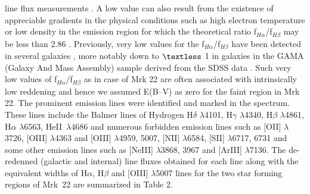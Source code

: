 \documentclass[useAMS,usenatbib]{mn2e}
\begin{document}
line flux measurements \citep{2006MNRAS.372..961K}. A low value can also result from the existence of appreciable gradients in the physical conditions such as high electron temperature or low density
in the emission region for which the theoretical ratio f$_{H\alpha}$/f$_{H\beta}$ may be less than 2.86 \citep{1980IzKry..62...54G,2009A&A...508..615L}. Previously, very low values for the f$_{H\alpha}$/f$_{H\beta}$ have been detected in several galaxies \citep{2009A&A...508..615L,2009MNRAS.396...97R}, more notably down to $\textless$ 1 in galaxies in the GAMA (Galaxy And Mass Assembly) sample derived from the SDSS data \citep{2013MNRAS.433.2764G}. Such very low values of f$_{H\alpha}$/f$_{H\beta}$ as in case of Mrk 22 are often associated with intrinsically low reddening and hence we assumed E(B--V) as zero for the faint region in Mrk 22. The prominent emission lines were identified and marked in the spectrum. These lines include the Balmer lines of Hydrogen H${\delta}$ $\lambda$4101, H${\gamma}$ $\lambda$4340, H${\beta}$ $\lambda$4861, H${\alpha}$ $\lambda$6563, He{\small{II}}~$\lambda$4686 and numerous forbidden emission lines such as [O{\small{II}}] $\lambda$3726, [O{\small{III}}] $\lambda$4363 and [O{\small{III}}] $\lambda$4959, 5007, [N{\small{II}}] $\lambda$6584, [S{\small{II}}] $\lambda$6717, 6731 and some other emission lines such as [Ne{\small{III}}] $\lambda$3868, 3967 and [Ar{\small{III}}] $\lambda$7136. The de-redenned (galactic and internal) line fluxes obtained for each line along with the equivalent widths of H${\alpha}$, H${\beta}$ and [O{\small{III}}] $\lambda$5007 lines for the two star forming regions of Mrk~22 are summarized in Table 2.

\end{document}

